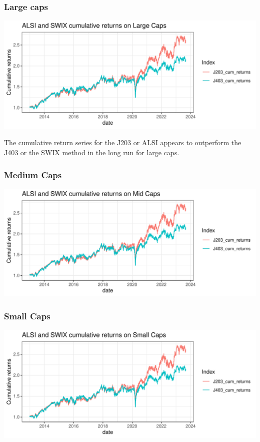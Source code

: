 \documentclass[11pt,preprint, authoryear]{elsarticle}
\numberwithin{equation}{section}
\numberwithin{figure}{section}
\numberwithin{table}{section}
\begin{document}
\hypertarget{large-caps}{%
\subsubsection*{Large caps}\label{large-caps}}

\includegraphics{Question3_files/figure-latex/unnamed-chunk-1-1.pdf}

The cumulative return series for the J203 or ALSI appears to outperform
the J403 or the SWIX method in the long run for large caps.

\hypertarget{medium-caps}{%
\subsubsection*{Medium Caps}\label{medium-caps}}

\includegraphics{Question3_files/figure-latex/unnamed-chunk-2-1.pdf}

\hypertarget{small-caps}{%
\subsubsection*{Small Caps}\label{small-caps}}

\includegraphics{Question3_files/figure-latex/unnamed-chunk-3-1.pdf}
\end{document}
